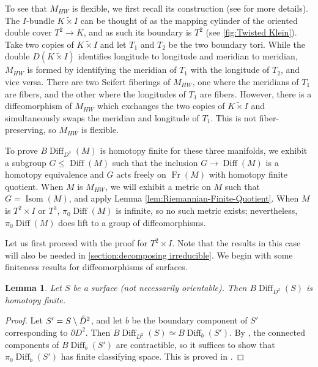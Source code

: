 \documentclass{amsart}
\theoremstyle{plain}
\newtheorem{lem}[thm]{Lemma}
\theoremstyle{definition}
\DeclareMathOperator\Diff{Diff}
\DeclareMathOperator\Isom{Isom}
\DeclareMathOperator\Fr{Fr}
\newcommand{\interior}[1]{\smash{\mathring{#1}}}
\newcommand{\BDiff}{B\!\Diff}
\newcommand{\Kx}{K\widetilde{\times}I}
\begin{document}
To see that $M_{HW}$ is flexible, we first recall its construction (see \cite[Section 3.9]{HKMR12} for more details). The $I$-bundle $K\tilde{\times} I$ can be thought of as the mapping cylinder of the oriented double cover $T^2\rightarrow K$, and as such its boundary is $T^2$ (see \cref{fig:Twisted Klein}). Take two copies of $\Kx$ and let $T_1$ and $T_2$ be the two boundary tori. While the double $D(K\tilde{\times} I)$  identifies longitude to longitude and meridian to meridian,  $M_{HW}$ is formed by identifying the meridian of $T_1$ with the longitude of $T_2$, and vice versa.  There are two Seifert fiberings of $M_{HW}$, one where the meridians of $T_1$ are fibers, and the other where the longitudes of $T_1$ are fibers.  However, there is a diffeomorphism of $M_{HW}$ which exchanges the two copies of $\Kx$ and simultaneously swaps the meridian and longitude of $T_1$.  This is not fiber-preserving, so $M_{HW}$ is flexible.



To prove $\BDiff_{D^3}(M)$ is homotopy finite for these three manifolds, we exhibit a subgroup $G\leq \Diff(M)$ such that the inclusion $G \to \Diff(M)$ is a homotopy equivalence and $G$ acts freely on $\Fr(M)$ with homotopy finite quotient. 
When $M$ is $M_{HW}$, we will exhibit a metric on $M$ such that $G= \Isom(M)$, and apply Lemma \ref{lem:Riemannian-Finite-Quotient}. When $M$ is $T^2\times I$ or $T^3$, $\pi_0\Diff(M)$ is infinite, so no such metric exists; nevertheless, $\pi_0\Diff(M)$ does lift to a group of diffeomorphisms. 



Let us first proceed with the proof for $T^2\times I$. Note that the results in this case will also be needed in \cref{section:decomposing irreducible}. We begin with some finiteness results for diffeomorphisms of surfaces.

\begin{lem}\label{lem:Surface-Fix-Disk-finite}
    Let $S$ be a surface (not necessarily orientable).  Then $\BDiff_{D^2}(S)$ is homotopy finite.
\end{lem}
\begin{proof}
    Let $S'=S\setminus \interior{D}^2$, and let $b$ be the boundary component of $S'$ corresponding to $\partial D^2$. Then  $\BDiff_{D^2}(S)\simeq \BDiff_b(S')$. By \cite[Proposition 6]{Gramain}, the connected components of $\BDiff_b(S')$ are contractible, so it suffices to show that $\pi_0\Diff_b(S')$ has finite classifying space.  This is proved in  \cite[Lemma 1.2]{HatcherMcCullough}.
\end{proof}
\end{document}
